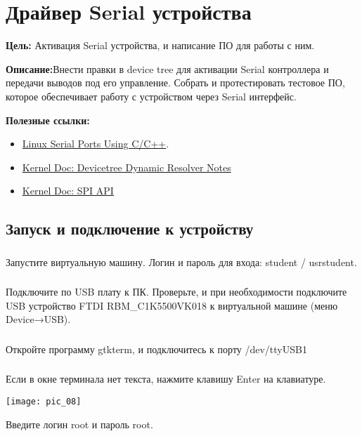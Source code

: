 \chapter{Драйвер Serial устройства}
\textbf{Цель:} Активация Serial устройства, и написание ПО для работы с ним.

\vspace{5mm}
\textbf{Описание:}Внести правки в device tree для активации Serial контроллера и передачи выводов под его управление. Собрать и протестировать тестовое ПО, которое обеспечивает работу с устройством через Serial интерфейс.

\vspace{5mm}
\textbf{Полезные ссылки:}
\begin{itemize}
	\item \href{https://blog.mbedded.ninja/programming/operating-systems/linux/linux-serial-ports-using-c-cpp/}{Linux Serial Ports Using C/C++}.
	\item \href{https://docs.kernel.org/devicetree/dynamic-resolution-notes.html}{Kernel Doc: Devicetree Dynamic Resolver Notes}
	\item \href{https://www.kernel.org/doc/html/v4.15/driver-api/spi.html}{Kernel Doc: SPI API}	
\end{itemize}

\section{Запуск и подключение к устройству}

\subsection{}Запустите виртуальную машину. Логин и пароль для входа: student / usrstudent.

\subsection{}Подключите по USB плату к ПК. Проверьте, и при необходимости подключите USB устройство FTDI RBM\_C1K5500VK018 к виртуальной машине (меню Device→USB).

\subsection{}Откройте программу gtkterm, и подключитесь к порту /dev/ttyUSB1

\subsection{}Если в окне терминала нет текста, нажмите клавишу Enter на клавиатуре.
\begin{center}
	\texttt{[image: pic\_08]}
\end{center}
Введите логин root и пароль root.


